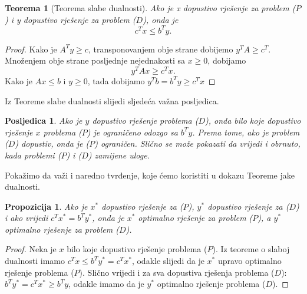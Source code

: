 \documentclass[a4paper, utf8, 11pt, colorlinks]{book}
\newtheorem{thm}{Teorema}[chapter]
\newtheorem{prop}{Propozicija}[chapter]
\newtheorem{poslje}{Posljedica}[chapter]
\theoremstyle{definition}
\begin{document}
\begin{thm}[Teorema slabe dualnosti]
  Ako je x dopustivo rješenje za problem ($P$) i y dopustivo rješenje za problem  ($D$), onda je 
  $$ c^T x \leq b^T y.$$
\end{thm}
\begin{proof}
         Kako je $A^T y \geq c $,  transponovanjem obje strane dobijemo 
         $y^T A \geq c^T$. Množenjem obje strane posljednje nejednakosti sa $x \geq 0$, dobijamo 
         $$y^TAx \geq c^T x.$$ Kako je $Ax \leq b$ i $y \geq 0$,  tada dobijamo 
         $ y^T b = b^T y  \geq c^T x$
\end{proof}
Iz Teoreme  slabe dualnosti slijedi sljedeća važna posljedica.
\begin{poslje}
	Ako je $y$ dopustivo rješenje problema  ($D$),  onda bilo koje dopustivo rješenje $x$ problema ($P$) je ograničeno odozgo sa $b^T y$. Prema tome, ako je problem ($D$) dopustiv, onda je ($P$) ograničen. Slično se može pokazati da vrijedi i obrnuto,  kada problemi ($P$) i ($D$) zamijene uloge.
\end{poslje}

Pokažimo da važi i naredno tvrđenje, koje ćemo koristiti u dokazu Teoreme jake dualnosti.

\begin{prop}  
    Ako je $x^*$ dopustivo rješenje za  ($P$), $y^*$ dopustivo rješenje za ($D$) i ako vrijedi 
    $c^T x^* = b^T y^*$, onda je $x^*$ optimalno rješenje za problem  ($P$), a $y^*$ optimalno rješenje za problem  ($D$).  
\end{prop}
\begin{proof}
        Neka je $x$ bilo koje dopustivo rješenje problema ($P$). Iz teoreme o slaboj dualnosti imamo $c^T x  \leq b^T y^* = c^T x^*$, odakle slijedi da je $x^*$ upravo optimalno rješenje problema  ($P$).
         Slično vrijedi i za sva dopustiva rješenja problema ($D$): $b^T y^* = c^T x^* \geq b^T y$, odakle imamo da je $y^*$ optimalno rješenje problema  ($D$). 
\end{proof}
\end{document}
